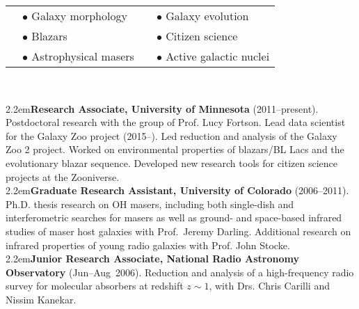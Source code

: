 
\medskip
{}
\vskip2pt
\medskip
\begin{tabular}{llll}
\hspace{50pt} & {$\bullet$ \large Galaxy morphology}  & \hspace{50pt} & {$\bullet$ \large Galaxy evolution}             \\
\hspace{50pt} & {$\bullet$ \large Blazars}        & \hspace{50pt} & {$\bullet$ \large Citizen science} \\
\hspace{50pt} & {$\bullet$ \large Astrophysical masers }   & \hspace{50pt} & {$\bullet$ \large Active galactic nuclei}          \\
\end{tabular}

\medskip\medskip
{}\\
\medskip

\hangindent2.2em{\large {\bf{\sc Research Associate}, University of Minnesota} (2011--present)}.  Postdoctoral research with the group of Prof. Lucy Fortson. Lead data scientist for the Galaxy Zoo project (2015--). Led reduction and analysis of the Galaxy Zoo 2 project. Worked on environmental properties of blazars/BL Lacs and the evolutionary blazar sequence. Developed new research tools for citizen science projects at the Zooniverse. \\[4pt]
\hangindent2.2em{\large {\bf{\sc Graduate Research Assistant}, University of Colorado} (2006--2011)}.  Ph.D. thesis research on OH masers, including both single-dish and interferometric searches for masers as well as ground- and space-based infrared studies of maser host galaxies with Prof.~Jeremy Darling. Additional research on infrared properties of young radio galaxies with Prof. John Stocke.\\[4pt]

\hangindent2.2em{\large {\bf{\sc Junior Research Associate}, National Radio Astronomy Observatory} (Jun--Aug~2006)}. Reduction and analysis of a high-frequency radio survey for molecular absorbers at redshift $z\sim1$, with Drs. Chris Carilli and Nissim Kanekar. \\[4pt]

